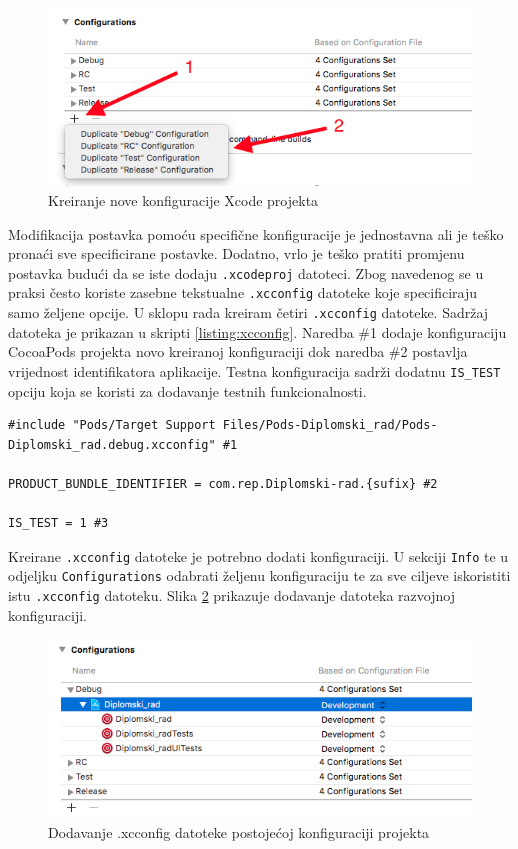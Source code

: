 \documentclass[times, utf8, diplomski, numeric]{fer}
\begin{document}
\begin{figure}[b!]
\centering
\includegraphics[scale=0.6]{XcodeConfigurationCreation}
\caption{Kreiranje nove konfiguracije Xcode projekta}
\label{fig:XcodeConfigurationCreation}
\end{figure}

Modifikacija postavka pomoću specifične konfiguracije je jednostavna ali je teško pronaći sve specificirane postavke. Dodatno, vrlo je teško pratiti promjenu postavka budući da se iste dodaju \verb|.xcodeproj| datoteci. Zbog navedenog se u praksi često koriste zasebne tekstualne \verb|.xcconfig| datoteke koje specificiraju samo željene opcije. U sklopu rada kreiram četiri \verb|.xcconfig| datoteke. Sadržaj datoteka je prikazan u skripti \ref{listing:xcconfig}. Naredba \#1 dodaje konfiguraciju CocoaPods projekta novo kreiranoj konfiguraciji dok naredba \#2 postavlja vrijednost identifikatora aplikacije. Testna konfiguracija sadrži dodatnu \verb|IS_TEST| opciju koja se koristi za dodavanje testnih funkcionalnosti.

\begin{lstlisting}[caption=Sadržaj .xcconfig datoteke, label=listing:xcconfig]
#include "Pods/Target Support Files/Pods-Diplomski_rad/Pods-Diplomski_rad.debug.xcconfig" #1

PRODUCT_BUNDLE_IDENTIFIER = com.rep.Diplomski-rad.{sufix} #2

IS_TEST = 1 #3
\end{lstlisting}

Kreirane \verb|.xcconfig| datoteke je potrebno dodati konfiguraciji. U sekciji \verb|Info| te u odjeljku \verb|Configurations| odabrati željenu konfiguraciju te za sve ciljeve iskoristiti istu \verb|.xcconfig| datoteku. Slika \ref{fig:XcodeXCConfigSet} prikazuje dodavanje datoteka razvojnoj konfiguraciji.

\begin{figure}
\centering
\includegraphics[scale=0.6]{XcodeXCConfigSet}
\caption{Dodavanje .xcconfig datoteke postojećoj konfiguraciji projekta}
\label{fig:XcodeXCConfigSet}
\end{figure}
\end{document}
